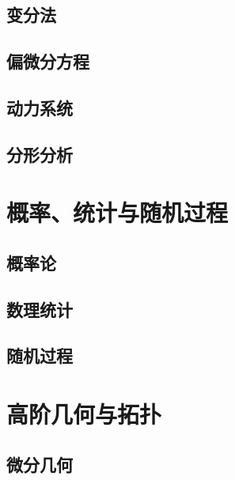 \documentclass[zihao=false,linespread=1.5,heading=true,a4paper,oneside,fontset=windows]{ctexbook}
\begin{document}
\chapter{变分法}\label{chap:calculus-of-variations}


\chapter{偏微分方程}\label{chap:partial-differential-equations}


\chapter{动力系统}\label{chap:dynamical-systems}


\chapter{分形分析}\label{chap:fractal-analysis}


\part{概率、统计与随机过程}\label{part:probability-statistics}

\chapter{概率论}\label{chap:probability}


\chapter{数理统计}\label{chap:mathematical-statistics}


\chapter{随机过程}\label{chap:stochastic-processes}


\part{高阶几何与拓扑}\label{part:advanced-geometry}

\chapter{微分几何}\label{chap:differential-geometry}

\end{document}
